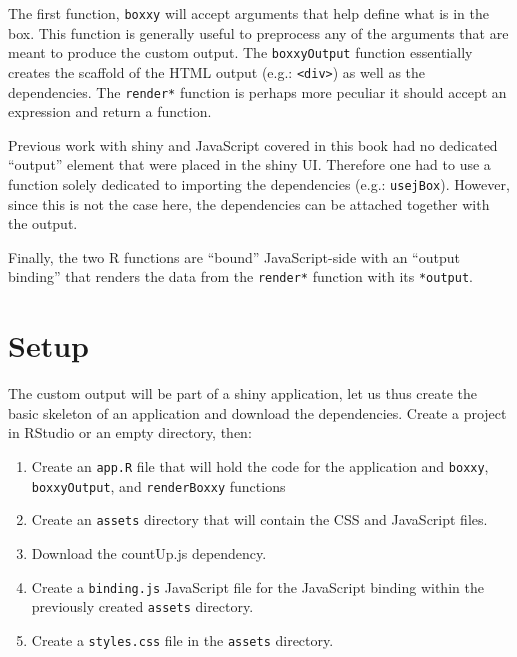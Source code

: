 \documentclass[10pt,]{krantz}
\providecommand{\tightlist}{%
  \setlength{\itemsep}{0pt}\setlength{\parskip}{0pt}}
\begin{document}
The first function, \texttt{boxxy} will accept arguments that help define what is in the box. This function is generally useful to preprocess any of the arguments that are meant to produce the custom output. The \texttt{boxxyOutput} function essentially creates the scaffold of the HTML output (e.g.: \texttt{\textless{}div\textgreater{}}) as well as the dependencies. The \texttt{render*} function is perhaps more peculiar it should accept an expression and return a function.

Previous work with shiny and JavaScript covered in this book had no dedicated ``output'' element that were placed in the shiny UI. Therefore one had to use a function solely dedicated to importing the dependencies (e.g.: \texttt{usejBox}). However, since this is not the case here, the dependencies can be attached together with the output.

Finally, the two R functions are ``bound'' JavaScript-side with an ``output binding'' that renders the data from the \texttt{render*} function with its \texttt{*output}.

\hypertarget{shiny-output-setup}{%
\section{Setup}\label{shiny-output-setup}}

The custom output will be part of a shiny application, let us thus create the basic skeleton of an application and download the dependencies. Create a project in RStudio or an empty directory, then:

\begin{enumerate}
\def\labelenumi{\arabic{enumi}.}
\tightlist
\item
  Create an \texttt{app.R} file that will hold the code for the application and \texttt{boxxy}, \texttt{boxxyOutput}, and \texttt{renderBoxxy} functions
\item
  Create an \texttt{assets} directory that will contain the CSS and JavaScript files.
\item
  Download the countUp.js dependency.
\item
  Create a \texttt{binding.js} JavaScript file for the JavaScript binding within the previously created \texttt{assets} directory.
\item
  Create a \texttt{styles.css} file in the \texttt{assets} directory.
\end{enumerate}
\end{document}
